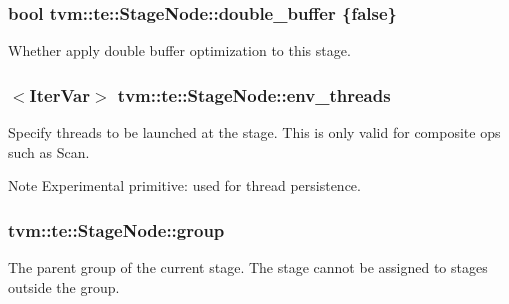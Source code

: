 \subsubsection[{\texorpdfstring{double\+\_\+buffer}{double_buffer}}]{\setlength{\rightskip}{0pt plus 5cm}bool tvm\+::te\+::\+Stage\+Node\+::double\+\_\+buffer \{false\}}\hypertarget{classtvm_1_1te_1_1StageNode_af5cb8c43f82eac4021fd06ab7c475f82}{}\label{classtvm_1_1te_1_1StageNode_af5cb8c43f82eac4021fd06ab7c475f82}


Whether apply double buffer optimization to this stage. 

\subsubsection[{\texorpdfstring{env\+\_\+threads}{env_threads}}]{$<${\bf Iter\+Var}$>$ tvm\+::te\+::\+Stage\+Node\+::env\+\_\+threads}\hypertarget{classtvm_1_1te_1_1StageNode_ac6bfe27a0802f257d467667522d0cbee}{}\label{classtvm_1_1te_1_1StageNode_ac6bfe27a0802f257d467667522d0cbee}


Specify threads to be launched at the stage. This is only valid for composite ops such as Scan. 

\begin{DoxyNote}{Note}
Experimental primitive\+: used for thread persistence. 
\end{DoxyNote}
\subsubsection[{\texorpdfstring{group}{group}}]{ tvm\+::te\+::\+Stage\+Node\+::group}\hypertarget{classtvm_1_1te_1_1StageNode_a02935c5eeeaa3ae794e971d449b5e377}{}\label{classtvm_1_1te_1_1StageNode_a02935c5eeeaa3ae794e971d449b5e377}


The parent group of the current stage. The stage cannot be assigned to stages outside the group. 

